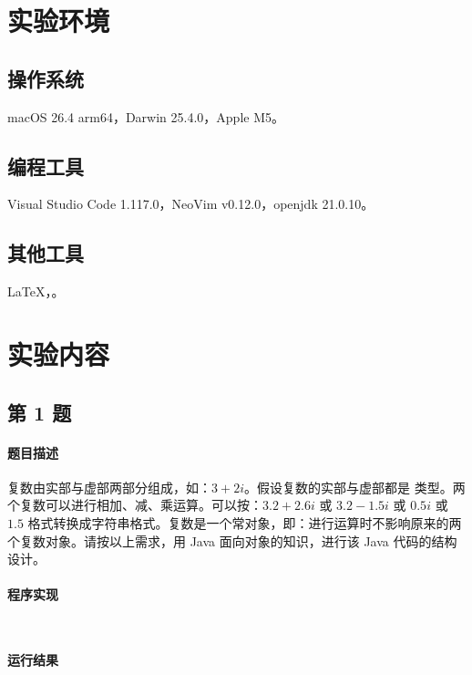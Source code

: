 \documentclass{academics}
\begin{document}
\makeacademicscover

\section{实验环境}

\subsection{操作系统}

macOS 26.4 arm64，Darwin 25.4.0，Apple M5。

\subsection{编程工具}

Visual Studio Code 1.117.0，NeoVim v0.12.0，openjdk 21.0.10。

\subsection{其他工具}

\LaTeX{}，。

\section{实验内容}

\subsection{第 1 题}

\paragraph{题目描述} {
    复数由实部与虚部两部分组成，如：$3+2i$。假设复数的实部与虚部都是  类型。两个复数可以进行相加、减、乘运算。可以按：$3.2+2.6i$ 或 $3.2-1.5i$ 或 $0.5i$ 或 $1.5$ 格式转换成字符串格式。复数是一个常对象，即：进行运算时不影响原来的两个复数对象。请按以上需求，用 Java 面向对象的知识，进行该 Java 代码的结构设计。
}

\paragraph{程序实现} {
    \inputminted[label=Complex.java]{java}{../src/P01/Complex.java}
    \inputminted[label=Main.java]{java}{../src/P01/Main.java}
}

\paragraph{运行结果} {
    \inputminted{text}{../res/P01.out}
}
\end{document}
